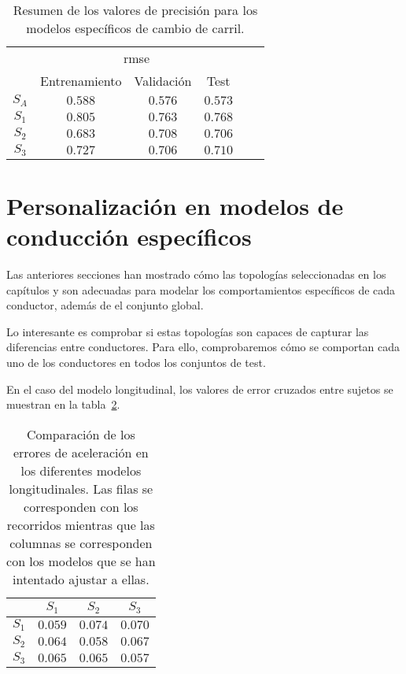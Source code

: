 \begin{table}
	\centering
	\caption[Resumen de los valores de precisión para los modelos específicos de cambio de carril]{Resumen de los valores de precisión para los modelos específicos de cambio de carril.}
	\label{tbl:lc-specific-accuracy}
	\begin{tabular}{cccccc}
		\toprule
		\multirow{2}{*}{} & \multicolumn{3}{c}{\ac{rmse}}      \\ 
		& Entrenamiento & Validación & Test \\
		\midrule
		\rowcolor{black!20} $S_A$ & $0.588$ & $0.576$ & $0.573$  \\
		$S_1$ & $0.805$ & $0.763$ & $0.768$  \\
		\rowcolor{black!20} $S_2$ & $0.683$ & $0.708$ & $0.706$  \\
		$S_3$ & $0.727$ & $0.706$ & $0.710$  \\
		\bottomrule
	\end{tabular}
\end{table}


\section{Personalización en modelos de conducción específicos}

Las anteriores secciones han mostrado cómo las topologías seleccionadas en los capítulos  y  son adecuadas para modelar los comportamientos específicos de cada conductor, además de el conjunto global.

Lo interesante es comprobar si estas topologías son capaces de capturar las diferencias entre conductores. Para ello, comprobaremos cómo se comportan cada uno de los conductores en todos los conjuntos de test.

En el caso del modelo longitudinal, los valores de error cruzados entre sujetos se muestran en la tabla~\ref{tbl:lm-subjects-comparison}.

\begin{table}
	\centering
	\caption[Comparación de los errores de aceleración en los diferentes modelos longitudinales]{Comparación de los errores de aceleración en los diferentes modelos longitudinales. Las filas se corresponden con los recorridos mientras que las columnas se corresponden con los modelos que se han intentado ajustar a ellas.}
	\label{tbl:lm-subjects-comparison}
	\begin{tabular}{cccc}
		\toprule
		& $S_1$ & $S_2$ & $S_3$ \\
		\midrule
		\rowcolor{black!20} $S_1$ & $0.059$        & $0.074$        & $0.070$ \\
		$S_2$ & $0.064$        & $0.058$        & $0.067$ \\
		\rowcolor{black!20} $S_3$ & $0.065$        & $0.065$        & $0.057$ \\
		\bottomrule
	\end{tabular}
\end{table}

